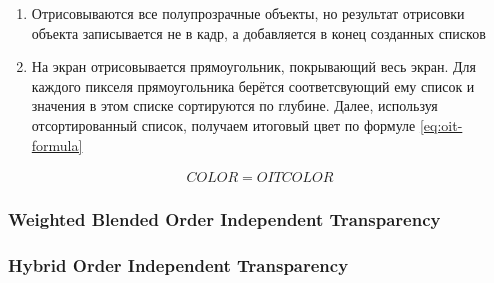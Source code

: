 			\begin{enumerate}[1.]
				\item Отрисовываются все полупрозрачные объекты, но результат отрисовки объекта записывается не в кадр, а добавляется в конец созданных списков
				\item На экран отрисовывается прямоугольник, покрывающий весь экран. Для каждого пикселя прямоугольника берётся соответсвующий ему список и значения в этом списке сортируются по глубине. Далее, используя отсортированный список, получаем итоговый цвет по формуле \ref{eq:oit-formula}
			 \end{enumerate}
			 
			 \begin{equation}
			 	\label{eq:oit-formula}
			 	\begin{multlined}
			 		COLOR = OITCOLOR
			 	\end{multlined}
			 \end{equation}
			
		\subsubsection{Weighted Blended Order Independent Transparency} \label{ch3:render_pass:transparents:wboit}
		\subsubsection{Hybrid Order Independent Transparency} \label{ch3:render_pass:transparents:hybrid_oit}